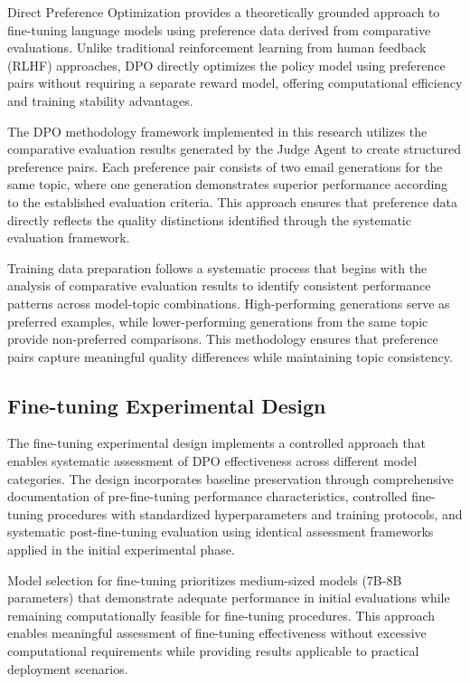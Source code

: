 Direct Preference Optimization provides a theoretically grounded approach to fine-tuning language models using preference data derived from comparative evaluations. Unlike traditional reinforcement learning from human feedback (RLHF) approaches, DPO directly optimizes the policy model using preference pairs without requiring a separate reward model, offering computational efficiency and training stability advantages.

The DPO methodology framework implemented in this research utilizes the comparative evaluation results generated by the Judge Agent to create structured preference pairs. Each preference pair consists of two email generations for the same topic, where one generation demonstrates superior performance according to the established evaluation criteria. This approach ensures that preference data directly reflects the quality distinctions identified through the systematic evaluation framework.

Training data preparation follows a systematic process that begins with the analysis of comparative evaluation results to identify consistent performance patterns across model-topic combinations. High-performing generations serve as preferred examples, while lower-performing generations from the same topic provide non-preferred comparisons. This methodology ensures that preference pairs capture meaningful quality differences while maintaining topic consistency.

\subsection{Fine-tuning Experimental Design}

The fine-tuning experimental design implements a controlled approach that enables systematic assessment of DPO effectiveness across different model categories. The design incorporates baseline preservation through comprehensive documentation of pre-fine-tuning performance characteristics, controlled fine-tuning procedures with standardized hyperparameters and training protocols, and systematic post-fine-tuning evaluation using identical assessment frameworks applied in the initial experimental phase.

Model selection for fine-tuning prioritizes medium-sized models (7B-8B parameters) that demonstrate adequate performance in initial evaluations while remaining computationally feasible for fine-tuning procedures. This approach enables meaningful assessment of fine-tuning effectiveness without excessive computational requirements while providing results applicable to practical deployment scenarios.

